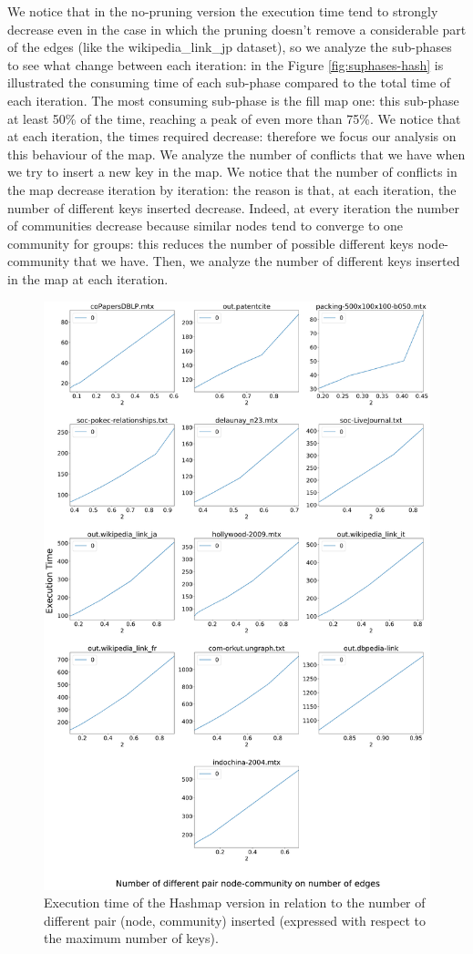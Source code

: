 We notice that in the no-pruning version the execution time tend to strongly decrease even in the case in which the pruning doesn't remove a considerable part of the edges (like the wikipedia\_link\_jp dataset), so we analyze the sub-phases to see what change between each iteration: in the Figure \ref{fig:suphases-hash} is illustrated the consuming time of each sub-phase compared to the total time of each iteration.
The most consuming sub-phase is the fill map one:  this sub-phase at least 50\% of the time, reaching a peak of even more than 75\%. We notice that at each iteration, the times required decrease: therefore we focus our analysis on this behaviour of the map. We analyze the number of conflicts that we have when we try to insert a new key in the map. 
We notice that the number of conflicts in the map decrease iteration by iteration: the reason is that, at each iteration, the number of different keys inserted decrease. Indeed, at every iteration the number of communities decrease because similar nodes tend to converge to one community for groups: this reduces the number of possible different keys node-community that we have. 
Then, we analyze the number of different keys inserted in the map at each iteration.\\
\begin{figure}[t!]
	\centering
	\includegraphics[width=0.7\linewidth]{0-resources/time-vs-possible-keys}
	\caption{Execution time of the Hashmap version in relation to the number of different pair (node, community) inserted (expressed with respect to the maximum number of keys).}
	\label{fig:time-vs-possible-keys}
\end{figure}
